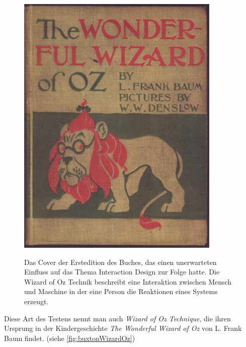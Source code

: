 \begin{figure}
	\begin{center}
        {\includegraphics[width=\linewidth]{gfx/buxtonWizardOz}}
	\end{center}
		\caption[Wizard of Oz \newline \citep{Buxton:2007}]{Das Cover der Erstedition des Buches, das einen unerwarteten Einfluss auf das Thema Interaction Design zur Folge hatte. Die Wizard of Oz Technik beschreibt eine Interaktion zwischen Mensch und Maschine in der eine Person die Reaktionen eines Systems erzeugt.}\label{fig:buxtonWizardOz}
\end{figure}

\medskip Diese Art des Testens nennt man auch \emph{Wizard of Oz Technique}, die ihren Ursprung in der Kindergeschichte \emph{The Wonderful Wizard of Oz} von L. Frank Baum findet. (siehe \autoref{fig:buxtonWizardOz}) 

